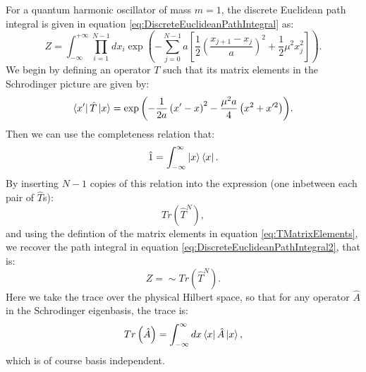 \documentclass[12pt]{article}
\begin{document}
For a quantum harmonic oscillator of mass $m=1$, the discrete Euclidean path integral is given in equation \ref{eq:DiscreteEuclideanPathIntegral} as:
\begin{equation}
	\label{eq:DiscreteEuclideanPathIntegral2}
	Z = \int^{+\infty}_{-\infty}\prod_{i=1}^{N-1}dx_i \exp{\left(-\sum^{N-1}_{j=0} a \left[\frac{1}{2}\left(\frac{x_{j+1}-x_j}{a}\right)^2+\frac{1}{2}\mu^2x_{j}^2\right]\right)}.
\end{equation}
We begin by defining an operator $T$ such that its matrix elements in the Schrodinger picture are given by:
\begin{equation}
	\label{eq:TMatrixElements}
	\bra{x'}\hat{T}\ket{x} = \exp{\left(-\frac{1}{2a}\left(x'-x\right)^2-\frac{\mu^2a}{4}\left(x^2+x'^2\right)\right)}.
\end{equation}
Then we can use the completeness relation that:
\begin{equation}
	\label{eq:CompletenessRelation}
	\hat{1} = \int_{-\infty}^{\infty}\ket{x}\bra{x}.
\end{equation}
By inserting $N-1$ copies of this relation into the expression (one inbetween each pair of $\hat{T}$s):
\begin{equation}
	\label{eq:TraceT}
	Tr\left(\hat{T}^{N}\right),
\end{equation}
and using the defintion of the matrix elements in equation \ref{eq:TMatrixElements}, we recover the path integral in equation \ref{eq:DiscreteEuclideanPathIntegral2}, that is:
\begin{equation}
	\label{eq:PathIntegralAsTrace}
	Z = \sim Tr\left(\hat{T}^N\right).
\end{equation}
Here we take the trace over the physical Hilbert space, so that for any operator $\hat{A}$ in the Schrodinger eigenbasis, the trace is:
\begin{equation}
	\label{eq:Trace}
	Tr\left(\hat{A}\right) = \int_{-\infty}^{\infty}dx\bra{x}\hat{A}\ket{x},
\end{equation}
which is of course basis independent.
\end{document}
